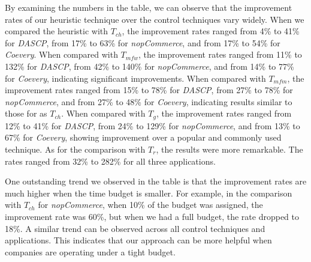 By examining the numbers in the table, we can observe that the improvement
rates of our heuristic technique over the control techniques vary widely. 
When we compared the heuristic with $T_{ch}$, the improvement rates ranged from
4\% to 41\% for {\em DASCP}, from 17\% to 63\% for {\em nopCommerce}, and from 17\% to 54\%
for {\em Coevery}.
When compared with $T_{mfw}$, the improvement rates ranged from
11\% to 132\% for {\em DASCP}, from 42\% to 140\% for {\em nopCommerce}, and from 14\% to 77\%
for {\em Coevery}, indicating significant improvements. 
When compared with $T_{mfm}$, the improvement rates ranged from
15\% to 78\% for {\em DASCP}, from 27\% to 78\% for {\em nopCommerce}, and from 27\% to 48\%
for {\em Coevery}, indicating results similar to those for as $T_{ch}$.
When compared with $T_{g}$, the improvement rates ranged from
12\% to 41\% for {\em DASCP}, from 24\% to 129\% for {\em nopCommerce}, and from 13\% to 67\%
for {\em Coevery}, showing improvement over a popular and commonly used technique.
As for the comparison with $T_{r}$, the results were more remarkable.
The rates ranged from 32\% to 282\% for all three applications. 

One outstanding trend we observed in the table is that the improvement 
rates are much higher when the time budget is smaller.
For example, in the comparison with $T_{ch}$ for {\em nopCommerce}, 
when 10\% of the budget was assigned, the improvement rate was 60\%,
but when we had a full budget, the rate dropped to 18\%.
A similar trend can be observed across all control techniques and applications.  
This indicates that our approach can be more helpful when companies are operating
under a tight budget.

